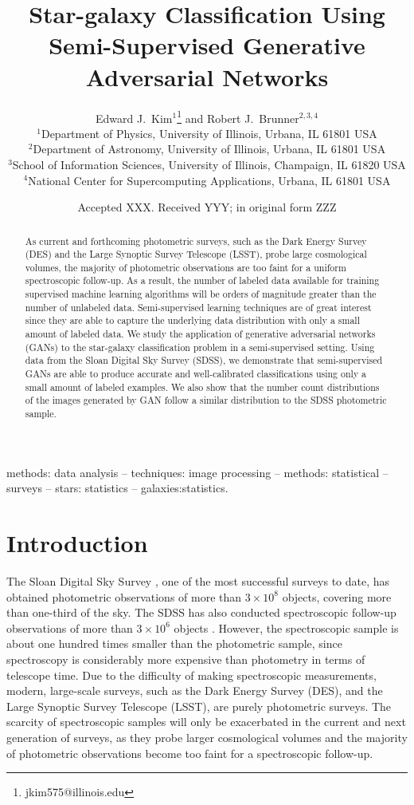 \documentclass[fleqn,usenatbib]{mnras}
\title[Star-galaxy Classification Using GANs]{Star-galaxy Classification Using Semi-Supervised Generative Adversarial Networks}
\author[E. J. Kim and R. J. Brunner]{
  Edward J.~Kim$^1$\thanks{jkim575@illinois.edu} and Robert J.~Brunner$^{2,3,4}$ \\
$^1$Department of Physics, University of Illinois, Urbana, IL 61801 USA\\
$^2$Department of Astronomy, University of Illinois, Urbana, IL 61801 USA\\
$^3$School of Information Sciences, University of Illinois, Champaign, IL 61820 USA\\
$^4$National Center for Supercomputing Applications, Urbana, IL 61801 USA\\
}
\date{Accepted XXX. Received YYY; in original form ZZZ}
\begin{document}
\label{firstpage}
\pagerange{\pageref{firstpage}--\pageref{lastpage}}
\maketitle

\begin{abstract}
As current and forthcoming photometric surveys, such as the Dark Energy Survey (DES) and the Large Synoptic Survey Telescope (LSST),
probe large cosmological volumes, the majority of photometric observations are too faint for a uniform spectroscopic follow-up.
As a result, the number of labeled data available for training supervised machine learning algorithms will be orders of magnitude
greater than the number of unlabeled data.
Semi-supervised learning techniques are of great interest since they are able to capture the underlying data distribution
with only a small amount of labeled data.
We study the application of generative adversarial networks (GANs) to the star-galaxy classification problem
in a semi-supervised setting.
Using data from the Sloan Digital Sky Survey (SDSS), we demonstrate that semi-supervised GANs are able to produce
accurate and well-calibrated classifications using only a small amount of labeled examples.
We also show that the number count distributions of the images generated by GAN follow a similar distribution to
the SDSS photometric sample.
\end{abstract}

\begin{keywords}
methods: data analysis -- techniques: image processing -- methods: statistical
-- surveys -- stars: statistics -- galaxies:statistics.
\end{keywords}

\section{Introduction}
  \label{sec:introduction}

The Sloan Digital Sky Survey \citep[SDSS;][]{york2000sloan}, one of the most successful surveys to date,
has obtained photometric observations of more than $3 \times 10^8$ objects, covering more than one-third of
the sky.
The SDSS has also conducted spectroscopic follow-up observations of more than $3 \times 10^6$
objects \citep{eisenstein2011sdss}.
However, the spectroscopic sample is about one hundred times smaller than the photometric sample,
since spectroscopy is considerably more expensive than photometry in terms of telescope time.
Due to the difficulty of making spectroscopic measurements,
modern, large-scale surveys, such as the Dark Energy Survey (DES),
and the Large Synoptic Survey Telescope (LSST), are purely photometric surveys.
The scarcity of spectroscopic samples will only be exacerbated in the current and next generation of surveys,
as they probe larger cosmological volumes and the majority of photometric observations become too faint
for a spectroscopic follow-up.
\end{document}
